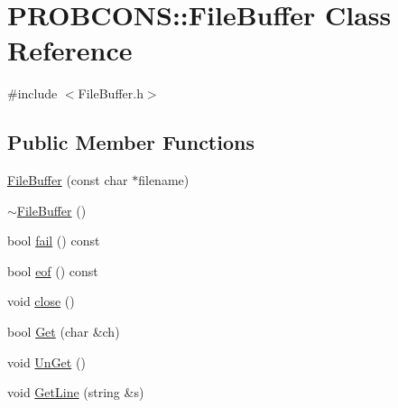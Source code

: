 \hypertarget{class_p_r_o_b_c_o_n_s_1_1_file_buffer}{\section{P\+R\+O\+B\+C\+O\+N\+S\+:\+:File\+Buffer Class Reference}
\label{class_p_r_o_b_c_o_n_s_1_1_file_buffer}
}


{\ttfamily \#include $<$File\+Buffer.\+h$>$}

\subsection*{Public Member Functions}
\begin{DoxyCompactItemize}
\item 
\hyperlink{class_p_r_o_b_c_o_n_s_1_1_file_buffer_abb9d988c796afd08091ff689b2ca1eb5}{File\+Buffer} (const char $\ast$filename)
\item 
\hyperlink{class_p_r_o_b_c_o_n_s_1_1_file_buffer_aa1f6b1f1db55a091450af21fd2a2db26}{$\sim$\+File\+Buffer} ()
\item 
bool \hyperlink{class_p_r_o_b_c_o_n_s_1_1_file_buffer_a2862067101705c942338d09773cee1f8}{fail} () const 
\item 
bool \hyperlink{class_p_r_o_b_c_o_n_s_1_1_file_buffer_ac6d73686698e1a25fe33f7ba945c490c}{eof} () const 
\item 
void \hyperlink{class_p_r_o_b_c_o_n_s_1_1_file_buffer_a9ef63162d1417dd978cf8dde34f4e24b}{close} ()
\item 
bool \hyperlink{class_p_r_o_b_c_o_n_s_1_1_file_buffer_af2ce2a32c9234f4d51d36c97da478963}{Get} (char \&ch)
\item 
void \hyperlink{class_p_r_o_b_c_o_n_s_1_1_file_buffer_ae903c231f24ed9eb3dd22173e7620077}{Un\+Get} ()
\item 
void \hyperlink{class_p_r_o_b_c_o_n_s_1_1_file_buffer_a01f6c43967612fcb43de72642cce84d7}{Get\+Line} (string \&s)
\end{DoxyCompactItemize}


